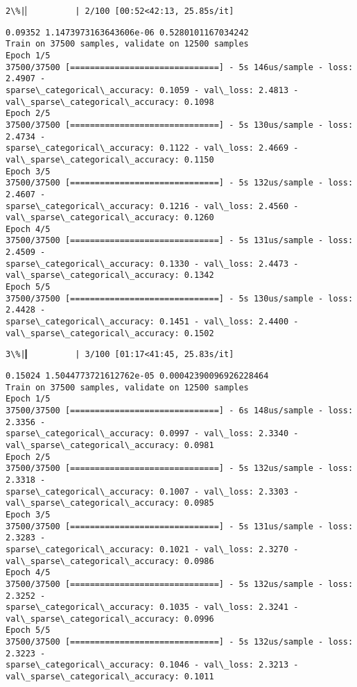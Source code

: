 \documentclass[11pt]{article}
\begin{document}
    \begin{Verbatim}[commandchars=\\\{\}]
  2\%|▏         | 2/100 [00:52<42:13, 25.85s/it]
    \end{Verbatim}

    \begin{Verbatim}[commandchars=\\\{\}]
0.09352 1.1473973163643606e-06 0.5280101167034242
Train on 37500 samples, validate on 12500 samples
Epoch 1/5
37500/37500 [==============================] - 5s 146us/sample - loss: 2.4907 -
sparse\_categorical\_accuracy: 0.1059 - val\_loss: 2.4813 -
val\_sparse\_categorical\_accuracy: 0.1098
Epoch 2/5
37500/37500 [==============================] - 5s 130us/sample - loss: 2.4734 -
sparse\_categorical\_accuracy: 0.1122 - val\_loss: 2.4669 -
val\_sparse\_categorical\_accuracy: 0.1150
Epoch 3/5
37500/37500 [==============================] - 5s 132us/sample - loss: 2.4607 -
sparse\_categorical\_accuracy: 0.1216 - val\_loss: 2.4560 -
val\_sparse\_categorical\_accuracy: 0.1260
Epoch 4/5
37500/37500 [==============================] - 5s 131us/sample - loss: 2.4509 -
sparse\_categorical\_accuracy: 0.1330 - val\_loss: 2.4473 -
val\_sparse\_categorical\_accuracy: 0.1342
Epoch 5/5
37500/37500 [==============================] - 5s 130us/sample - loss: 2.4428 -
sparse\_categorical\_accuracy: 0.1451 - val\_loss: 2.4400 -
val\_sparse\_categorical\_accuracy: 0.1502
    \end{Verbatim}

    \begin{Verbatim}[commandchars=\\\{\}]
  3\%|▎         | 3/100 [01:17<41:45, 25.83s/it]
    \end{Verbatim}

    \begin{Verbatim}[commandchars=\\\{\}]
0.15024 1.5044773721612762e-05 0.00042390096926228464
Train on 37500 samples, validate on 12500 samples
Epoch 1/5
37500/37500 [==============================] - 6s 148us/sample - loss: 2.3356 -
sparse\_categorical\_accuracy: 0.0997 - val\_loss: 2.3340 -
val\_sparse\_categorical\_accuracy: 0.0981
Epoch 2/5
37500/37500 [==============================] - 5s 132us/sample - loss: 2.3318 -
sparse\_categorical\_accuracy: 0.1007 - val\_loss: 2.3303 -
val\_sparse\_categorical\_accuracy: 0.0985
Epoch 3/5
37500/37500 [==============================] - 5s 131us/sample - loss: 2.3283 -
sparse\_categorical\_accuracy: 0.1021 - val\_loss: 2.3270 -
val\_sparse\_categorical\_accuracy: 0.0986
Epoch 4/5
37500/37500 [==============================] - 5s 132us/sample - loss: 2.3252 -
sparse\_categorical\_accuracy: 0.1035 - val\_loss: 2.3241 -
val\_sparse\_categorical\_accuracy: 0.0996
Epoch 5/5
37500/37500 [==============================] - 5s 132us/sample - loss: 2.3223 -
sparse\_categorical\_accuracy: 0.1046 - val\_loss: 2.3213 -
val\_sparse\_categorical\_accuracy: 0.1011
    \end{Verbatim}
\end{document}
